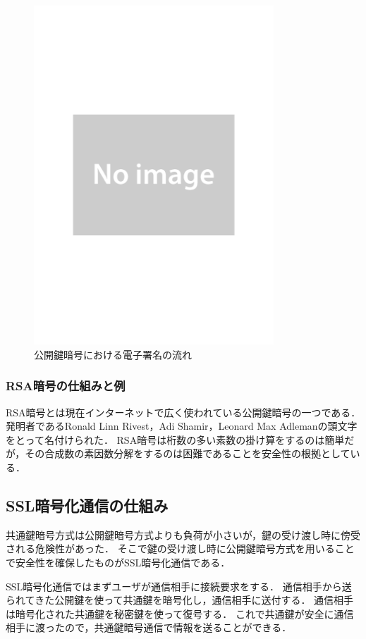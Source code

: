 \documentclass[a4j,12pt]{jsarticle}
\begin{document}
\begin{figure}[H]
\centering
\includegraphics[width=9cm]{noimage.pdf}
\caption{公開鍵暗号における電子署名の流れ}
\label{fig:no}
\end{figure} 




\subsubsection{RSA暗号の仕組みと例}
RSA暗号とは現在インターネットで広く使われている公開鍵暗号の一つである．
発明者であるRonald Linn Rivest，Adi Shamir，Leonard Max Adlemanの頭文字をとって名付けられた．
RSA暗号は桁数の多い素数の掛け算をするのは簡単だが，その合成数の素因数分解をするのは困難であることを安全性の根拠としている．




\subsection{SSL暗号化通信の仕組み}
共通鍵暗号方式は公開鍵暗号方式よりも負荷が小さいが，鍵の受け渡し時に傍受される危険性があった．
そこで鍵の受け渡し時に公開鍵暗号方式を用いることで安全性を確保したものがSSL暗号化通信である．

SSL暗号化通信ではまずユーザが通信相手に接続要求をする．
通信相手から送られてきた公開鍵を使って共通鍵を暗号化し，通信相手に送付する．
通信相手は暗号化された共通鍵を秘密鍵を使って復号する．
これで共通鍵が安全に通信相手に渡ったので，共通鍵暗号通信で情報を送ることができる．
\end{document}
